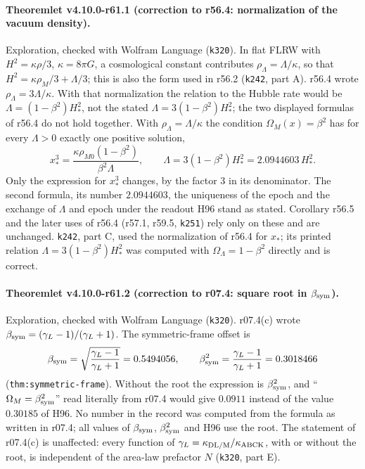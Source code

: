 \paragraph{Theoremlet v4.10.0-r61.1 (correction to r56.4: normalization of the vacuum density).}
Exploration, checked with Wolfram Language (\texttt{k320}).  In flat FLRW with \(H^2=\kappa\rho/3\), \(\kappa=8\pi G\), a cosmological constant
contributes \(\rho_\Lambda=\Lambda/\kappa\), so that \(H^2=\kappa\rho_M/3+\Lambda/3\); this is also the form used in r56.2 (\texttt{k242}, part A).
r56.4 wrote \(\rho_\Lambda=3\Lambda/\kappa\).  With that normalization the relation to the Hubble rate would be \(\Lambda=(1-\beta^2)H_*^2\), not the
stated \(\Lambda=3(1-\beta^2)H_*^2\); the two displayed formulas of r56.4 do not hold together.  With \(\rho_\Lambda=\Lambda/\kappa\) the condition
\(\Omega_M(x)=\beta^2\) has for every \(\Lambda>0\) exactly one positive solution,
\[
x_*^3=\frac{\kappa\rho_{M0}(1-\beta^2)}{\beta^2\Lambda},\qquad \Lambda=3(1-\beta^2)H_*^2=2.0944603\,H_*^2 .
\]
Only the expression for \(x_*^3\) changes, by the factor 3 in its denominator.  The second formula, its number \(2.0944603\), the uniqueness of the
epoch and the exchange of \(\Lambda\) and epoch under the readout H96 stand as stated.  Corollary r56.5 and the later uses of r56.4 (r57.1, r59.5,
\texttt{k251}) rely only on these and are unchanged.  \texttt{k242}, part C, used the normalization of r56.4 for \(x_*\); its printed relation
\(\Lambda=3(1-\beta^2)H_*^2\) was computed with \(\Omega_\Lambda=1-\beta^2\) directly and is correct.

\paragraph{Theoremlet v4.10.0-r61.2 (correction to r07.4: square root in \(\beta_{\rm sym}\)).}
Exploration, checked with Wolfram Language (\texttt{k320}).  r07.4(c) wrote \(\beta_{\rm sym}=(\gamma_L-1)/(\gamma_L+1)\).  The symmetric-frame
offset is
\[
\beta_{\rm sym}=\sqrt{\frac{\gamma_L-1}{\gamma_L+1}}=0.5494056,\qquad \beta_{\rm sym}^2=\frac{\gamma_L-1}{\gamma_L+1}=0.3018466
\]
(\texttt{thm:symmetric-frame}).  Without the root the expression is \(\beta_{\rm sym}^2\), and ``\(\Omega_M=\beta_{\rm sym}^2\)'' read literally from
r07.4 would give \(0.0911\) instead of the value \(0.30185\) of H96.  No number in the record was computed from the formula as written in r07.4;
all values of \(\beta_{\rm sym}\), \(\beta_{\rm sym}^2\) and H96 use the root.  The statement of r07.4(c) is unaffected: every function of
\(\gamma_L=\kappa_{\rm DL/M}/\kappa_{\rm ABCK}\), with or without the root, is independent of the area-law prefactor \(N\) (\texttt{k320}, part E).

